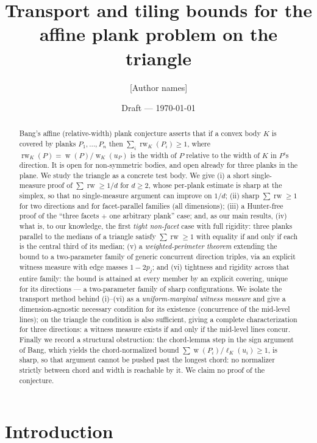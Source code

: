 \documentclass[11pt,reqno]{amsart}
\title{Transport and tiling bounds for the affine plank problem on the triangle}
\author{[Author names]}
\date{Draft --- \today}
\theoremstyle{plain}
\theoremstyle{definition}
\theoremstyle{remark}
\newcommand{\rw}{\operatorname{rw}}
\DeclareMathOperator{\wid}{w}
\begin{document}
\begin{abstract}
Bang's affine (relative-width) plank conjecture asserts that if a convex body $K$
is covered by planks $P_1,\dots,P_n$ then $\sum_i \rw_K(P_i)\ge 1$, where
$\rw_K(P)=\wid(P)/\wid_K(u_P)$ is the width of $P$ relative to the width of $K$ in
$P$'s direction. It is open for non-symmetric bodies, and open already for three
planks in the plane. We study the triangle as a concrete test body. We give (i) a
short single-measure proof of $\sum\rw\ge 1/d$ for $d\ge2$, whose per-plank estimate
is sharp at the simplex, so that no single-measure argument can improve on $1/d$;
(ii) sharp
$\sum\rw\ge 1$ for two directions and for facet-parallel families (all dimensions);
(iii) a Hunter-free proof of the ``three facets $+$ one arbitrary plank'' case; and,
as our main results, (iv) what is, to our knowledge, the first \emph{tight
non-facet} case with full rigidity:
three planks parallel to the medians of a triangle satisfy $\sum\rw\ge1$ with
equality if and only if each is the central third of its median; (v) a
\emph{weighted-perimeter theorem} extending the bound to a two-parameter family of
generic concurrent direction triples, via an explicit witness measure with edge
masses $1-2p_j$; and (vi) tightness and rigidity across that entire family: the
bound is attained at every member by an explicit covering, unique for its
directions --- a two-parameter family of sharp configurations. We isolate the
transport method behind (i)--(vi) as a
\emph{uniform-marginal witness measure} and give a dimension-agnostic necessary
condition for its existence (concurrence of the mid-level lines); on the
triangle the condition is also sufficient, giving a complete characterization
for three directions: a witness measure exists if and only if the mid-level
lines concur. Finally we
record a structural obstruction: the chord-lemma step in the sign argument of Bang,
which yields the chord-normalized bound $\sum \wid(P_i)/\ell_K(u_i)\ge1$, is sharp,
so that argument cannot be pushed past the longest chord: no normalizer strictly
between chord and width is reachable by it. We claim no proof of the conjecture.
\end{abstract}
\maketitle

\section{Introduction}\label{sec:intro}
\end{document}
